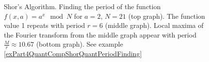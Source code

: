 \begin{figure}
\centering





\caption{Shor's Algorithm. Finding the period of the function 
  $f\left(x, a\right) = a^x \mod{N}$ for $a=2$, $N = 21$ (top graph). 
  The function value 1 repeats with period $r=6$ (middle graph). 
  Local maxima of the Fourier transform from the middle graph 
  appear with period $\frac{M}{r} \approx 10.67$ (bottom graph). See
  example \ref{exPart4QuantCompShorQuantPeriodFinding}}
\label{picPart4QuantCompShorQuantPart}
\end{figure}
